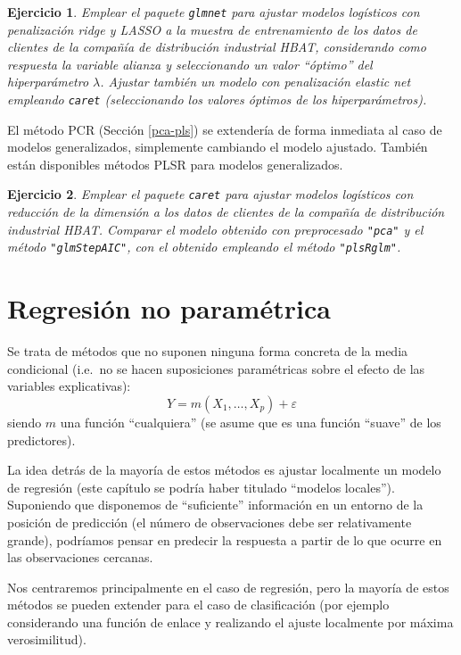 \documentclass[
]{book}
\theoremstyle{break}
\newtheorem{exercise}{Ejercicio}[chapter]
\theoremstyle{nonumberplain}
\begin{document}
\begin{exercise}
\protect\hypertarget{exr:glmnet}{}\label{exr:glmnet}Emplear el paquete \texttt{glmnet} para ajustar modelos logísticos con penalización \emph{ridge} y LASSO a la muestra de entrenamiento de los datos de clientes de la compañía de distribución industrial HBAT, considerando como respuesta la variable \emph{alianza} y seleccionando un valor ``óptimo'' del hiperparámetro \(\lambda\).
Ajustar también un modelo con penalización \emph{elastic net} empleando \texttt{caret} (seleccionando los valores óptimos de los hiperparámetros).
\end{exercise}

El método PCR (Sección \ref{pca-pls}) se extendería de forma inmediata al caso de modelos generalizados, simplemente cambiando el modelo ajustado.
También están disponibles métodos PLSR para modelos generalizados.

\begin{exercise}
\protect\hypertarget{exr:glm-reduccion}{}\label{exr:glm-reduccion}Emplear el paquete \texttt{caret} para ajustar modelos logísticos con reducción de la dimensión a los datos de clientes de la compañía de distribución industrial HBAT. Comparar el modelo obtenido con preprocesado \texttt{"pca"} y el método \texttt{"glmStepAIC"}, con el obtenido empleando el método \texttt{"plsRglm"}.
\end{exercise}

\hypertarget{reg-np}{%
\chapter{Regresión no paramétrica}\label{reg-np}}

Se trata de métodos que no suponen ninguna forma concreta de la media condicional (i.e.~no se hacen suposiciones paramétricas sobre el efecto de las variables explicativas):
\[Y=m\left( X_1, \ldots,  X_p \right) + \varepsilon\]
siendo \(m\) una función ``cualquiera'' (se asume que es una función ``suave'' de los predictores).

La idea detrás de la mayoría de estos métodos es ajustar localmente un modelo de regresión (este capítulo se podría haber titulado ``modelos locales'').
Suponiendo que disponemos de ``suficiente'' información en un entorno de la posición de predicción (el número de observaciones debe ser relativamente grande), podríamos pensar en predecir la respuesta a partir de lo que ocurre en las observaciones cercanas.

Nos centraremos principalmente en el caso de regresión, pero la mayoría de estos métodos se pueden extender para el caso de clasificación (por ejemplo considerando una función de enlace y realizando el ajuste localmente por máxima verosimilitud).
\end{document}
